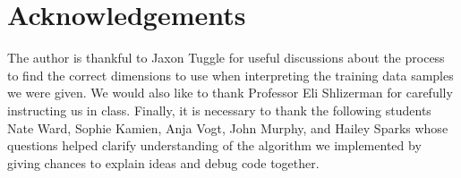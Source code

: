 \documentclass[11pt]{amsart}
\begin{document}
\section*{Acknowledgements} 

The author is thankful to Jaxon Tuggle for useful discussions about the process to find the correct dimensions to use when interpreting the training data samples we were given.
We would also like to thank Professor Eli Shlizerman for carefully instructing us in class.
Finally, it is necessary to thank the following students Nate Ward, Sophie Kamien, Anja Vogt, John Murphy, and Hailey Sparks whose questions helped clarify understanding of the algorithm we implemented by giving chances to explain ideas and debug code together.


\end{document}
